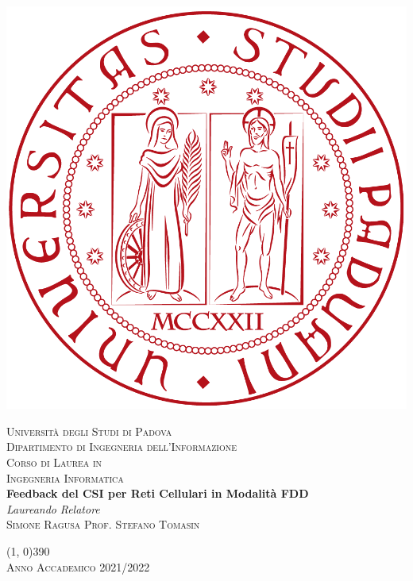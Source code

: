 



\frontmatter

\begin{titlepage}
    \begin{center}
        \includegraphics[scale=0.1]{images/unipd-red.png}

        \vspace{0.8cm}
        \textsc{\LARGE Università degli Studi di Padova}\\
        \vspace{0.45cm}
        \textsc{\large Dipartimento di Ingegneria dell'Informazione}\\
        \vspace{0.4cm}
        \textsc{\large Corso di Laurea in}\\
        \textsc{\large Ingegneria Informatica}\\

        \vfill
        {\LARGE \bfseries Feedback del CSI per Reti Cellulari in Modalità FDD}\\

        \vfill
        \textit{\large Laureando}
        \hfill
        \textit{\large Relatore}\\
        \textsc{\large Simone Ragusa}
        \hfill
        \textsc{\large Prof. Stefano Tomasin}\\

        \vspace{0.4cm}

        \vfill
        \line(1, 0){390}\\
        \textsc{Anno Accademico 2021/2022}
    \end{center}
\end{titlepage}

